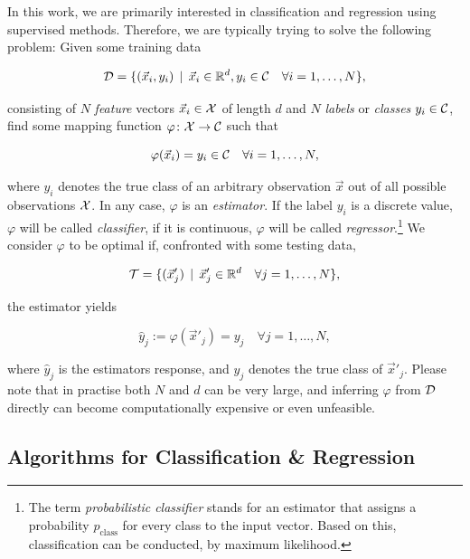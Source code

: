 In this work, we are primarily interested in classification and regression using supervised methods. Therefore, we are typically trying to solve the following problem: Given some training data

\begin{equation}
\mathcal{D} = \{ (\vec x_i, y_i) \, \mid \, \vec x_i \in \mathbb{R}^d, y_i \in \mathcal{C} \quad \forall i = 1,\ldots,N \},
\end{equation}

consisting of $N$ \emph{feature} vectors $\vec x_i \in \mathcal{X}$ of length $d$ and $N$ \emph{labels} or \emph{classes} $y_i \in \mathcal{C}$, find some mapping function $\varphi \colon \mathcal{X} \to \mathcal{C}$ such that

\begin{equation}
\varphi(\vec x_i) = y_i \in \mathcal{C} \quad \forall i = 1,\ldots,N,
\end{equation}

where $y_i$ denotes the true class of an arbitrary observation $\vec x$ out of all possible observations $\mathcal{X}$. In any case, $\varphi$ is an \emph{estimator}. If the label $y_i$ is a discrete value, $\varphi$ will be called \emph{classifier}, if it is continuous, $\varphi$ will be called \emph{regressor}.\footnote{The term \emph{probabilistic classifier} stands for an estimator that assigns a probability $p_{\text{class}}$ for every class to the input vector. Based on this, classification can be conducted, \eg by maximum likelihood.} We consider $\varphi$ to be optimal if, confronted with some testing data,

\begin{equation}
\mathcal{T} = \{ (\vec x'_j) \, \mid \, \vec x'_j \in \mathbb{R}^d \quad \forall j = 1,\ldots,N \},
\end{equation}

the estimator yields

\begin{equation}
\hat y_j := \varphi({\vec x'_j}) = y_j \quad \forall j = 1,\ldots,N,
\end{equation}

where $\hat y_j$ is the estimators response, and $y_j$ denotes the true class of $\vec x'_j$. Please note that in practise both $N$ and $d$ can be very large, and inferring $\varphi$ from $\mathcal{D}$ directly can become computationally expensive or even unfeasible.

\subsection{Algorithms for Classification \& Regression}
\label{subsec:algorithms-classification-and-regression}
